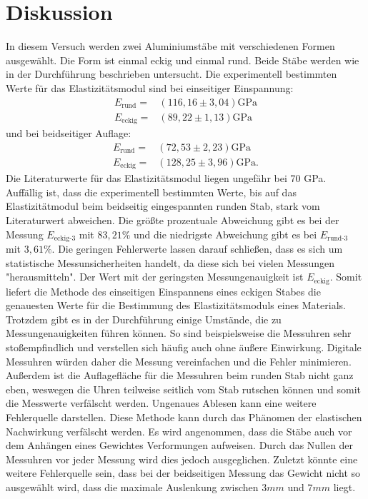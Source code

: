 \section{Diskussion}
\label{sec:Diskussion}
In diesem Versuch werden zwei Aluminiumstäbe mit verschiedenen Formen ausgewählt.
Die Form ist einmal eckig und einmal rund.
Beide Stäbe werden wie in der Durchführung beschrieben untersucht.
Die experimentell bestimmten Werte für das Elastizitätsmodul sind bei einseitiger Einspannung:
\begin{align*}
    E_{\text{rund}}=&(116,16\pm3,04)\si{\giga\pascal}\\
    E_{\text{eckig}}=&(89,22\pm1,13)\si{\giga\pascal}
 \end{align*}
und bei beidseitiger Auflage:
\begin{align*}
    E_{\text{rund}}=&(72,53\pm2,23)\si{\giga\pascal}\\
    E_{\text{eckig}}=&(128,25\pm3,96)\si{\giga\pascal} \text{.}
 \end{align*}
Die Literaturwerte für das Elastizitätsmodul \cite{Elastizität} liegen ungefähr bei 70 GPa. 
Auffällig ist, dass die experimentell bestimmten Werte, bis auf das Elastizitätmodul beim beidseitig eingespannten runden Stab, stark vom Literaturwert abweichen.
Die größte prozentuale Abweichung gibt es bei der Messung $E_{\text{eckig-3}}$ mit $83,21\%$ und die niedrigste Abweichung gibt es bei $E_{\text{rund-3}}$ mit $3,61\%$.
Die geringen Fehlerwerte lassen darauf schließen, dass es sich um statistische Messunsicherheiten handelt, da diese sich bei vielen Messungen "herausmitteln".
Der Wert mit der geringsten Messungenauigkeit ist $E_{\text{eckig}}$. 
Somit liefert die Methode des einseitigen Einspannens eines eckigen Stabes die genauesten Werte für die Bestimmung des Elastizitätsmoduls eines Materials.\\
Trotzdem gibt es in der Durchführung einige Umstände, die zu Messungenauigkeiten führen können.
So sind beispielsweise die Messuhren sehr stoßempfindlich und verstellen sich häufig auch ohne äußere Einwirkung.
Digitale Messuhren würden daher die Messung vereinfachen und die Fehler minimieren.
Außerdem ist die Auflagefläche für die Messuhren beim runden Stab nicht ganz eben, weswegen die Uhren teilweise seitlich vom Stab rutschen können und somit die Messwerte verfälscht werden.
Ungenaues Ablesen kann eine weitere Fehlerquelle darstellen.
Diese Methode kann durch das Phänomen der elastischen Nachwirkung verfälscht werden.
Es wird angenommen, dass die Stäbe auch vor dem Anhängen eines Gewichtes Verformungen aufweisen.
Durch das Nullen der Messuhren vor jeder Messung wird dies jedoch ausgeglichen.
Zuletzt könnte eine weitere Fehlerquelle sein, dass bei der beidseitigen Messung das Gewicht nicht so ausgewählt wird, dass die maximale Auslenkung zwischen $3 \unit{mm}$ und $7 \unit{mm}$ liegt.
\pagebreak